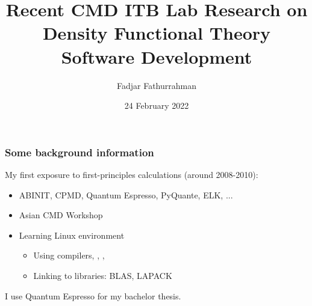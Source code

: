 




\title{Recent CMD ITB Lab Research on\\
Density Functional Theory Software Development}
\author{Fadjar Fathurrahman}
\date{24 February 2022}

\frame{\titlepage}


\begin{frame}[fragile]
\frametitle{Some background information}

My first exposure to first-principles calculations (around 2008-2010):
\begin{itemize}
\item ABINIT, CPMD, Quantum Espresso, PyQuante, ELK, ...
\item Asian CMD Workshop
\item Learning Linux environment
  \begin{itemize}
  \item Using compilers, , , 
  \item Linking to libraries: BLAS, LAPACK
  \end{itemize}
\end{itemize}

I use Quantum Espresso for my bachelor thesis.


\end{frame}



